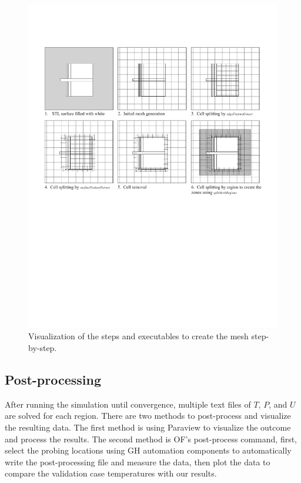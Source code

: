 \begin{figure}[htb]
     \centering
    \includegraphics[trim=1cm 11cm 1cm 3cm, clip, width=1\linewidth]{Figures/snappyhex.pdf}
     \caption[Mesh Creation Steps]{Visualization of the steps and executables to create the mesh step-by-step.}
   \label{meshsteps}
 \end{figure}


\subsection{Post-processing}
After running the simulation until convergence, multiple text files of $T$, $P$, and $U$ are solved for each region. There are two methods to post-process and visualize the resulting data. The first method is using Paraview to visualize the outcome and process the results. The second method is \gls{OF}'s post-process command, first, select the probing locations using \gls{GH} automation components to automatically write the post-processing file and measure the data, then plot the data to compare the validation case temperatures with our results. 




